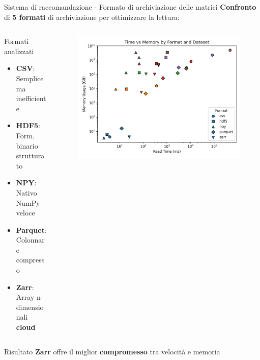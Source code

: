 \documentclass{beamer}
\begin{document}
	\begin{frame}{Sistema di raccomandazione - Formato di archiviazione delle matrici}
        \textbf{Confronto} di \textbf{5 formati} di archiviazione per ottimizzare la lettura:

		\begin{columns}
			\begin{column}{0.6\textwidth}
				\begin{block}{Formati analizzati}
					\begin{itemize}
						\item \textbf{CSV}: Semplice ma inefficiente
						\item \textbf{HDF5}: Form. binario strutturato
						\item \textbf{NPY}: Nativo NumPy veloce
						\item \textbf{Parquet}: Colonnare compresso
						\item \textbf{Zarr}: Array n-dimensionali \textbf{cloud}
					\end{itemize}
				\end{block}
			\end{column}
			\begin{column}{0.4\textwidth}
				\begin{figure}
					\centering
					\includegraphics[width=\textwidth]{time_vs_memory.png}
				\end{figure}
			\end{column}
		\end{columns}

		\begin{alertblock}{Risultato}
			\textbf{Zarr} offre il miglior \textbf{compromesso} tra velocità e memoria
		\end{alertblock}
	\end{frame}
\end{document}
